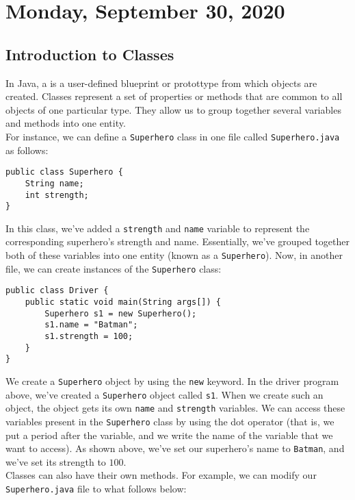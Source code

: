 \section{Monday, September 30, 2020}


\subsection{Introduction to Classes}

In Java, a  is a user-defined blueprint or protottype from which objects are created. Classes represent a set of properties or methods that are common to all objects of one particular type. They allow us to group together several variables and methods into one entity. \\

For instance, we can define a \verb!Superhero! class in one file called \verb!Superhero.java! as follows:

\begin{lstlisting}
public class Superhero {
    String name;
    int strength;
}
\end{lstlisting}

In this class, we've added a \verb!strength! and \verb!name! variable to represent the corresponding superhero's strength and name. Essentially, we've grouped together both of these variables into one entity (known as a \verb!Superhero!). Now, in another file, we can create instances of the \verb!Superhero! class: 

\begin{lstlisting}
public class Driver {
    public static void main(String args[]) {
        Superhero s1 = new Superhero();
        s1.name = "Batman";
        s1.strength = 100;
    }
}
\end{lstlisting}

We create a \verb!Superhero! object by using the \verb!new! keyword. In the driver program above, we've created a \verb!Superhero! object called \verb!s1!. When we create such an object, the object gets its own \verb!name! and \verb!strength! variables. We can access these variables present in the \verb!Superhero! class by using the dot operator (that is, we put a period after the variable, and we write the name of the variable that we want to access). As shown above, we've set our superhero's name to \verb!Batman!, and we've set its strength to $100$. \\

Classes can also have their own methods. For example, we can modify our \verb!Superhero.java! file to what follows below:

